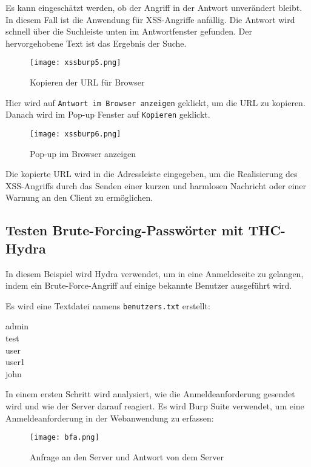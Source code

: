 Es kann eingeschätzt werden, ob der Angriff in der Antwort unverändert bleibt. In diesem Fall ist die Anwendung für XSS-Angriffe anfällig. Die Antwort wird schnell über die Suchleiste unten im Antwortfenster gefunden. Der hervorgehobene Text ist das Ergebnis der Suche.

\begin{figure}[h]
	\centering
	\texttt{[image: xssburp5.png]}
	\caption{Kopieren der URL für Browser}
\end{figure}

Hier wird auf \texttt{Antwort im Browser anzeigen} geklickt, um die URL zu kopieren. Danach wird im Pop-up Fenster auf \texttt{Kopieren} geklickt.

\newpage

\begin{figure}[h]
	\centering
	\texttt{[image: xssburp6.png]}
	\caption{Pop-up im Browser anzeigen}
\end{figure}

Die kopierte URL wird in die Adressleiste eingegeben, um die Realisierung des
XSS-Angriffs durch das Senden einer kurzen und harmlosen Nachricht oder einer
Warnung an den Client zu ermöglichen.


\subsection{Testen Brute-Forcing-Passwörter mit THC-Hydra}

In diesem Beispiel wird Hydra verwendet, um in eine Anmeldeseite zu gelangen, indem ein Brute-Force-Angriff auf einige bekannte Benutzer ausgeführt wird\cite[143]{najera2016kali}.

Es wird eine Textdatei namens \texttt{benutzers.txt} erstellt{\cite[144]{najera2016kali}}:

\begin{center}
	admin\\test\\user\\user1\\john
\end{center}

In einem ersten Schritt wird analysiert, wie die Anmeldeanforderung gesendet wird und wie der Server darauf reagiert. Es wird Burp Suite verwendet, um eine Anmeldeanforderung in der Webanwendung zu erfassen\cite[144]{najera2016kali}:

\newpage

\begin{figure}[h]
	\centering
	\texttt{[image: bfa.png]}
	\caption{Anfrage an den Server und Antwort von dem Server}
\end{figure}

